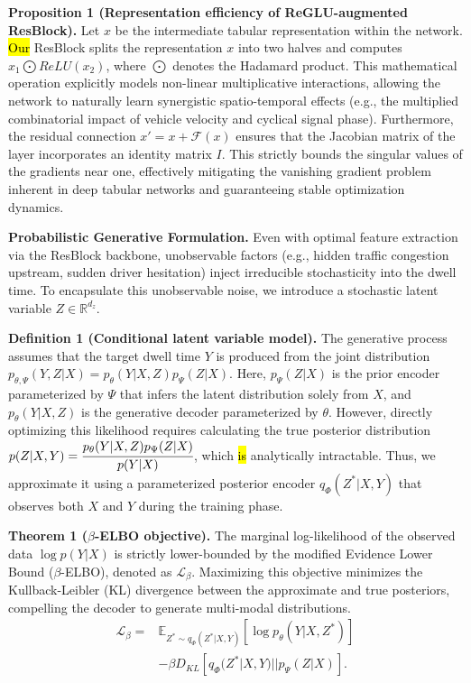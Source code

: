\documentclass[journal]{IEEEtran}
\begin{document}
\textbf{Proposition 1 (Representation efficiency of ReGLU-augmented ResBlock).}
Let $x$ be the intermediate tabular representation within the network.
\hl{Our} ResBlock splits the representation $x$ into two halves and computes $x_{1}\bigodot ReLU(x_{2})$, where $\bigodot$ denotes the Hadamard product.
This mathematical operation explicitly models non-linear multiplicative interactions, allowing the network to naturally learn synergistic spatio-temporal effects (e.g., the multiplied combinatorial impact of vehicle velocity and cyclical signal phase).
Furthermore, the residual connection $x'=x+\mathcal{F}(x)$ ensures that the Jacobian matrix of the layer incorporates an identity matrix $I$.
This strictly bounds the singular values of the gradients near one, effectively mitigating the vanishing gradient problem inherent in deep tabular networks and guaranteeing stable optimization dynamics.

\textbf{Probabilistic Generative Formulation.}
Even with optimal feature extraction via the ResBlock backbone, unobservable factors (e.g., hidden traffic congestion upstream, sudden driver hesitation) inject irreducible stochasticity into the dwell time.
To encapsulate this unobservable noise, we introduce a stochastic latent variable $Z\in \mathbb{R}^{d_{z}}$.

\textbf{Definition 1 (Conditional latent variable model).}
The generative process assumes that the target dwell time $Y$ is produced from the joint distribution $p_{\theta, \Psi}(Y,Z|X)=p_{\theta}(Y|X,Z)p_{\Psi}(Z|X)$.
Here, $p_{\Psi}(Z|X)$ is the prior encoder parameterized by $\Psi$ that infers the latent distribution solely from $X$, and $p_{\theta}(Y|X,Z)$ is the generative decoder parameterized by $\theta$.
However, directly optimizing this likelihood requires calculating the true posterior distribution $p(Z|X,Y)=\cfrac{p_{\theta}(Y|X,Z)p_{\Psi}(Z|X)}{p(Y|X)}$, which \hl{is} analytically intractable.
Thus, we approximate it using a parameterized posterior encoder $q_{\Phi}(Z^{*}|X,Y)$ that observes both $X$ and $Y$ during the training phase.

\textbf{Theorem 1 ($\beta$-ELBO objective).}
The marginal log-likelihood of the observed data $\log p(Y|X)$ is strictly lower-bounded by the modified Evidence Lower Bound ($\beta$-ELBO), denoted as $\mathcal{L}_{\beta}$.
Maximizing this objective minimizes the Kullback-Leibler (KL) divergence between the approximate and true posteriors, compelling the decoder to generate multi-modal distributions.
\begin{equation}\begin{split}
    \mathcal{L}_{\beta}=&\mathbb{E}_{Z^{*}\sim q_{\Phi}(Z^{*}|X,Y)} \left[ \log p_{\theta}(Y|X,Z^{*})  \right]\\
    & - \beta D_{KL} \left[ q_{\Phi}(Z^{*}|X,Y)||p_{\Psi}(Z|X)\right].
\end{split}\end{equation}
\end{document}
